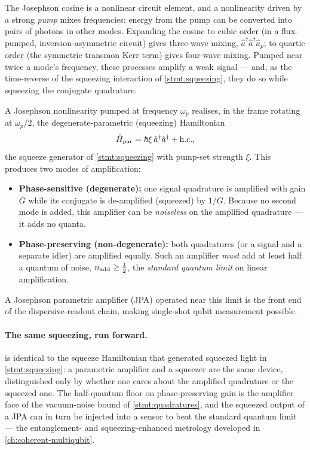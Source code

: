 \begin{phenomenon}
The Josephson cosine is a nonlinear circuit element, and a nonlinearity
driven by a strong \emph{pump} mixes frequencies: energy from the pump
can be converted into pairs of photons in other modes. Expanding the
cosine to cubic order (in a flux-pumped, inversion-asymmetric circuit)
gives three-wave mixing, $\hat a^\dagger\hat a^\dagger\hat a_p$; to
quartic order (the symmetric transmon Kerr term) gives four-wave
mixing. Pumped near twice a mode's frequency, these processes amplify a
weak signal --- and, as the time-reverse of the squeezing interaction
of \cref{stmt:squeezing}, they do so while squeezing the conjugate
quadrature.
\end{phenomenon}

\begin{statement}
\label{stmt:parametric-amp}
A Josephson nonlinearity pumped at frequency $\omega_p$ realises, in
the frame rotating at $\omega_p/2$, the degenerate-parametric
(squeezing) Hamiltonian
\begin{equation}
\label{eq:parametric-hamiltonian}
\hat{H}_{\rm par} = \hbar\xi\,\hat a^\dagger\hat a^\dagger + \text{h.c.},
\end{equation}
the squeeze generator of \cref{stmt:squeezing} with pump-set strength
$\xi$. This produces two modes of amplification:
\begin{itemize}
\item \textbf{Phase-sensitive (degenerate):} one signal quadrature is
  amplified with gain $G$ while its conjugate is de-amplified
  (squeezed) by $1/G$. Because no second mode is added, this amplifier
  can be \emph{noiseless} on the amplified quadrature --- it adds no
  quanta.
\item \textbf{Phase-preserving (non-degenerate):} both quadratures (or
  a signal and a separate idler) are amplified equally. Such an
  amplifier \emph{must} add at least half a quantum of noise,
  $n_{\rm add}\ge\tfrac12$, the \emph{standard quantum limit} on linear
  amplification.
\end{itemize}
A Josephson parametric amplifier (JPA) operated near this limit is the
front end of the dispersive-readout chain, making single-shot qubit
measurement possible.
\end{statement}

\paragraph{The same squeezing, run forward.}
 is identical to the squeeze
Hamiltonian that generated squeezed light in \cref{stmt:squeezing}: a
parametric amplifier and a squeezer are the same device, distinguished
only by whether one cares about the amplified quadrature or the
squeezed one. The half-quantum floor on phase-preserving gain is the
amplifier face of the vacuum-noise bound of \cref{stmt:quadratures}, and
the squeezed output of a JPA can in turn be injected into a sensor to
beat the standard quantum limit --- the entanglement- and
squeezing-enhanced metrology developed in \cref{ch:coherent-multiqubit}.

